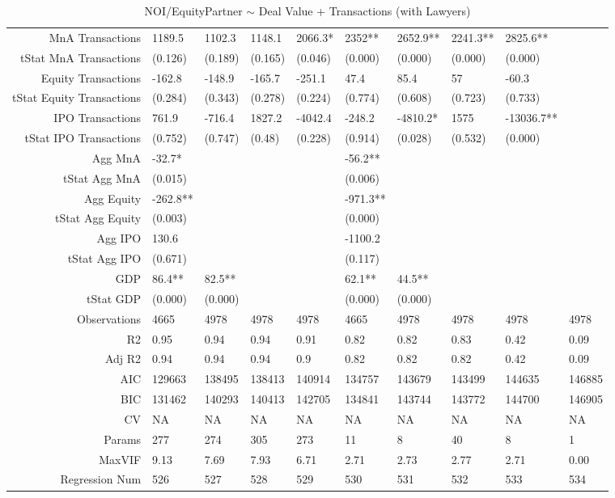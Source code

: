 \begin{table}[ht]
\begin{tabular}{rlllllllll}
  MnA Transactions & 1189.5 & 1102.3 & 1148.1 & 2066.3* & 2352** & 2652.9** & 2241.3** & 2825.6** &  \\ 
  tStat MnA Transactions & (0.126) & (0.189) & (0.165) & (0.046) & (0.000) & (0.000) & (0.000) & (0.000) &  \\ 
  Equity Transactions & -162.8 & -148.9 & -165.7 & -251.1 & 47.4 & 85.4 & 57 & -60.3 &  \\ 
  tStat Equity Transactions & (0.284) & (0.343) & (0.278) & (0.224) & (0.774) & (0.608) & (0.723) & (0.733) &  \\ 
  IPO Transactions & 761.9 & -716.4 & 1827.2 & -4042.4 & -248.2 & -4810.2* & 1575 & -13036.7** &  \\ 
  tStat IPO Transactions & (0.752) & (0.747) & (0.48) & (0.228) & (0.914) & (0.028) & (0.532) & (0.000) &  \\ 
  Agg MnA & -32.7* &  &  &  & -56.2** &  &  &  &  \\ 
  tStat Agg MnA & (0.015) &  &  &  & (0.006) &  &  &  &  \\ 
  Agg Equity & -262.8** &  &  &  & -971.3** &  &  &  &  \\ 
  tStat Agg Equity & (0.003) &  &  &  & (0.000) &  &  &  &  \\ 
  Agg IPO & 130.6 &  &  &  & -1100.2 &  &  &  &  \\ 
  tStat Agg IPO & (0.671) &  &  &  & (0.117) &  &  &  &  \\ 
  GDP & 86.4** & 82.5** &  &  & 62.1** & 44.5** &  &  &  \\ 
  tStat GDP & (0.000) & (0.000) &  &  & (0.000) & (0.000) &  &  &  \\ 
  Observations & 4665 & 4978 & 4978 & 4978 & 4665 & 4978 & 4978 & 4978 & 4978 \\ 
  R2 & 0.95 & 0.94 & 0.94 & 0.91 & 0.82 & 0.82 & 0.83 & 0.42 & 0.09 \\ 
  Adj R2 & 0.94 & 0.94 & 0.94 & 0.9 & 0.82 & 0.82 & 0.82 & 0.42 & 0.09 \\ 
  AIC & 129663 & 138495 & 138413 & 140914 & 134757 & 143679 & 143499 & 144635 & 146885 \\ 
  BIC & 131462 & 140293 & 140413 & 142705 & 134841 & 143744 & 143772 & 144700 & 146905 \\ 
  CV & NA & NA & NA & NA & NA & NA & NA & NA & NA \\ 
  Params & 277 & 274 & 305 & 273 & 11 & 8 & 40 & 8 & 1 \\ 
  MaxVIF & 9.13 & 7.69 & 7.93 & 6.71 & 2.71 & 2.73 & 2.77 & 2.71 & 0.00 \\ 
  Regression Num & 526 & 527 & 528 & 529 & 530 & 531 & 532 & 533 & 534 \\ 
   \hline
\end{tabular}
\caption{NOI/EquityPartner $\sim$ Deal Value + Transactions (with Lawyers)} 
\end{table}
